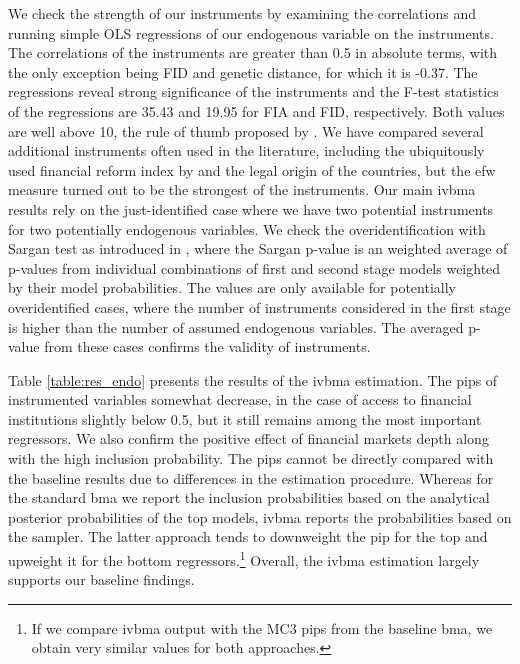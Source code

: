 \documentclass[a4paper,11pt]{article}
\begin{document}
We check the strength of our instruments by examining the correlations and running simple OLS regressions of our endogenous variable on the instruments. The correlations of the instruments are greater than 0.5 in absolute terms, with the only exception being FID and genetic distance, for which it is -0.37. The regressions reveal strong significance of the instruments and the F-test statistics of the regressions are 35.43 and 19.95 for FIA and FID, respectively. Both values are well above 10, the rule of thumb proposed by \citet{staiger1997instrumental}. We have compared several additional instruments often used in the literature, including the ubiquitously used financial reform index by \citet{Abiadetal2008} and the legal origin of the countries, but the \ac{efw} measure turned out to be the strongest of the instruments. Our main \ac{ivbma} results rely on the just-identified case where we have two potential instruments for two potentially endogenous variables. We check the overidentification with Sargan test as introduced in \citet{lenkoski2014two}, where the Sargan p-value is an weighted average of p-values from individual combinations of first and second stage models weighted by their model probabilities. The values are only available for potentially overidentified cases, where the number of instruments considered in the first stage is higher than the number of assumed endogenous variables. The averaged p-value from these cases confirms the validity of instruments.

Table \ref{table:res_endo} presents the results of the \ac{ivbma} estimation. The \acp{pip} of instrumented variables somewhat decrease, in the case of access to financial institutions slightly below 0.5, but it still remains among the most important regressors. We also confirm the positive effect of financial markets depth along with the high inclusion probability. The \acp{pip} cannot be directly compared with the baseline results due to differences in the estimation procedure. Whereas for the standard \ac{bma} we report the inclusion probabilities based on the analytical posterior probabilities of the top models, \ac{ivbma} reports the probabilities based on the sampler. The latter approach tends to downweight the \ac{pip} for the top and upweight it for the bottom regressors.\footnote{If we compare \ac{ivbma} output with the MC3 \acp{pip} from the baseline \ac{bma}, we obtain very similar values for both approaches.} Overall, the \ac{ivbma} estimation largely supports our baseline findings. 
\end{document}
